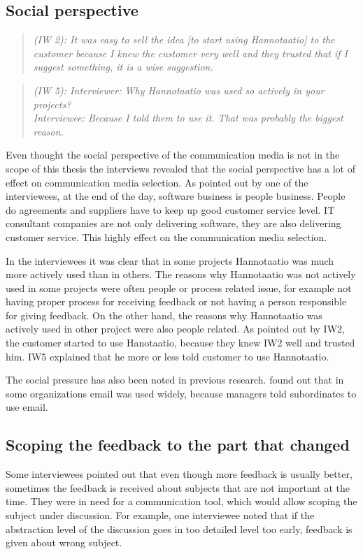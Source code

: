 \documentclass[english,12pt,a4paper,pdftex]{article}
\newcommand{\q}[2]{
\begin{quote}
\emph{(IW #1): #2}
\end{quote}}
\begin{document}
\subsection{Social perspective}

\q{2}{It was easy to sell the idea [to start using Hannotaatio] to the customer because I knew the customer very well and they trusted that if I suggest something, it is a wise suggestion.}

\q{5}{Interviewer: Why Hannotaatio was used so actively in your projects? \\ Interviewee: Because I told them to use it. That was probably the biggest reason.}

Even thought the social perspective of the communication media is not in the scope of this thesis the interviews revealed that the social perspective has a lot of effect on communication media selection. As pointed out by one of the interviewees, at the end of the day, software business is people business. People do agreements and suppliers have to keep up good customer service level. IT consultant companies are not only delivering software, they are also delivering customer service. This highly effect on the communication media selection.

In the interviewees it was clear that in some projects Hannotaatio was much more actively used than in others. The reasons why Hannotaatio was not actively used in some projects were often people or process related issue, for example not having proper process for receiving feedback or not having a person responsible for giving feedback. On the other hand, the reasons why Hannotaatio was actively used in other project were also people related. As pointed out by IW2, the customer started to use Hanotaatio, because they knew IW2 well and trusted him. IW5 explained that he more or less told customer to use Hannotaatio.

The social pressure has also been noted in previous research. \citet{elshinnawy1997} found out that in some organizations email was used widely, because managers told subordinates to use email.

\subsection{Scoping the feedback to the part that changed}

Some interviewees pointed out that even though more feedback is usually better, sometimes the feedback is received about subjects that are not important at the time. They were in need for a communication tool, which would allow scoping the subject under discussion. For example, one interviewee noted that if the abstraction level of the discussion goes in too detailed level too early, feedback is given about wrong subject.
\end{document}
